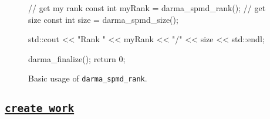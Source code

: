 \begin{subs}
\begin{figure}[!h]
\begin{CppCodeNumb}
{  // get my rank
  const int myRank = darma_spmd_rank();
  // get size 
  const int size = darma_spmd_size();

  std::cout << "Rank " << myRank << "/" << size << std::endl;

  darma_finalize();
  return 0;
}
\end{CppCodeNumb}
\label{fig:fe_api_ranksize}
\caption{Basic usage of \texttt{darma\_spmd\_rank}.}
\end{figure}

\end{subs}






\clearpage
\subsection{\underline{\texttt{create\_work}}}
\label{ssec:api_fe_cw}

